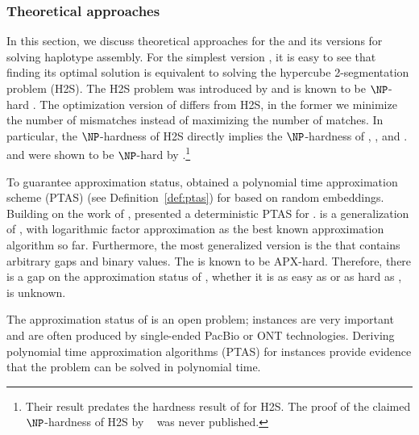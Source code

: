 \subsubsection{Theoretical approaches}
In this section, we discuss theoretical approaches for the \MEC and its versions for solving haplotype assembly.
For the simplest version \BMEC, it is easy to see that finding its optimal solution is equivalent to solving the hypercube 2-segmentation problem (H2S).
The H2S problem was introduced by \cite{KPR98_segmentation,KPR04_segmentation} and is known to be $\NP$-hard \citep{Fei14_np,KPR04_segmentation}.
The optimization version of \BMEC  differs from H2S, in the former we minimize the number of mismatches instead of maximizing the number of matches.
In particular, the $\NP$-hardness of H2S directly implies the $\NP$-hardness of \BMEC, \GMEC, and \MEC.
\GMEC and \MEC were shown to be $\NP$-hard by \citep{Cilibrasi2007}.\footnote{Their result predates the hardness result of \cite{Fei14_np} for H2S. The proof of the claimed $\NP$-hardness of H2S by ~\cite{KPR98_segmentation} was never published.}

To guarantee approximation status, \cite{OR02_polynomial} obtained a polynomial time approximation scheme (PTAS) (see Definition~\ref{def:ptas}) for \BMEC based on random embeddings.
Building on the work of \cite{LMW02_finding}, \cite{JXL04_k} presented a deterministic PTAS for \BMEC.
\GMEC is a generalization of \BMEC, with logarithmic factor approximation as the best known approximation algorithm so far.
Furthermore, the most generalized version is the \MEC that contains arbitrary gaps and binary values. The \MEC is known to be APX-hard. 
Therefore, there is a gap on the approximation status of \GMEC,  whether it is as easy as \BMEC or as hard as \MEC, is unknown.


\begin{gaps}
 The approximation status of \GMEC is an open problem; \GMEC instances are very important and are often produced by single-ended PacBio or ONT technologies.
 Deriving polynomial time approximation algorithms (PTAS) for \GMEC instances provide evidence that the problem can be solved in polynomial time.
 \label{gap:gap1}
\end{gaps}

